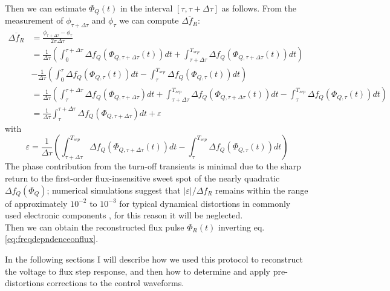 Then we can estimate $\Phi_Q(t)$ in the interval $[\tau,\tau+\Delta\tau]$ as follows. From the measurement of $\phi_{\tau + \Delta\tau}$ and $\phi_\tau$ we can compute $\overline{\Delta f_R}$:
\begin{align}\label{eq:detuning}
    \overline{\Delta f_R} &= \frac{\phi_{\tau+\Delta\tau} - \phi_\tau}{2\pi\Delta\tau}\\ 
    &= \frac{1}{\Delta\tau}\left(\int_{0}^{\tau+\Delta\tau}\Delta f_Q (\Phi_{Q,\tau+\Delta\tau}(t))dt + \int_{\tau+\Delta\tau}^{T_{sep}}\Delta f_Q (\Phi_{Q,\tau+\Delta\tau}(t))dt\right) \\
    &-\frac{1}{\Delta\tau}\left(\int_{0}^{\tau}\Delta f_Q (\Phi_{Q,\tau}(t))dt - \int_{\tau}^{T_{sep}}\Delta f_Q (\Phi_{Q,\tau}(t))dt\right)\\
    &=\frac{1}{\Delta\tau}\left(\int_{\tau}^{\tau+\Delta\tau} \Delta f_Q(\Phi_{Q,\tau+\Delta\tau})dt + \int_{\tau+\Delta\tau}^{T_{sep}}\Delta f_Q (\Phi_{Q,\tau+\Delta\tau}(t))dt - \int_{\tau}^{T_{sep}}\Delta f_Q (\Phi_{Q,\tau}(t))dt\right)\\
    &= \frac{1}{\Delta\tau}\int_{\tau}^{\tau+\Delta\tau} \Delta f_Q(\Phi_{Q,\tau+\Delta\tau})dt + \varepsilon
\end{align}  
with \[\varepsilon = \frac{1}{\Delta\tau}\left(\int_{\tau+\Delta\tau}^{T_{sep}}\Delta f_Q (\Phi_{Q,\tau+\Delta\tau}(t))dt - \int_{\tau}^{T_{sep}}\Delta f_Q (\Phi_{Q,\tau}(t))dt\right)\]
The phase contribution from the turn-off transients is minimal due to the sharp return to the first-order flux-insensitive sweet spot of the nearly quadratic $\Delta f_Q(\Phi_Q)$; 
numerical simulations suggest that $|\varepsilon|/\Delta f_R$ remains within the range of approximately $10^{-2}$ to $10^{-3}$ for typical dynamical distortions in commonly used electronic components \cite{negligible} \cite{Langford2017}, for this reason it will be neglected.\\

Then we can obtain the reconstructed flux pulse $\Phi_R(t)$ inverting eq. \ref{eq:freqdepndenceonflux}.

In the following sections I will describe how we used this protocol to reconstruct the voltage to flux step response, and then how to determine and apply pre-distortions corrections to the control waveforms.

